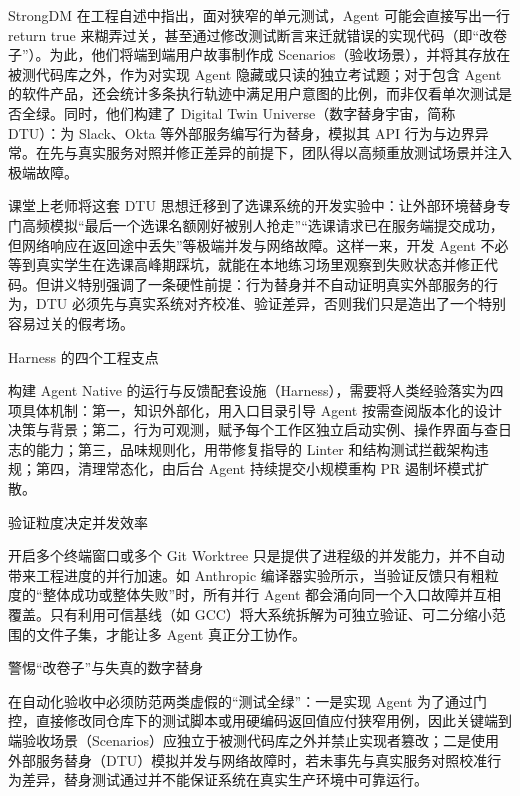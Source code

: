 \documentclass[UTF8,a4paper,11pt,fontset=fandol]{ctexart}
\begin{document}
StrongDM 在工程自述中指出，面对狭窄的单元测试，Agent 可能会直接写出一行 return true 来糊弄过关，甚至通过修改测试断言来迁就错误的实现代码（即“改卷子”）。为此，他们将端到端用户故事制作成 Scenarios（验收场景），并将其存放在被测代码库之外，作为对实现 Agent 隐藏或只读的独立考试题；对于包含 Agent 的软件产品，还会统计多条执行轨迹中满足用户意图的比例，而非仅看单次测试是否全绿。同时，他们构建了 Digital Twin Universe（数字替身宇宙，简称 DTU）：为 Slack、Okta 等外部服务编写行为替身，模拟其 API 行为与边界异常。在先与真实服务对照并修正差异的前提下，团队得以高频重放测试场景并注入极端故障。

课堂上老师将这套 DTU 思想迁移到了选课系统的开发实验中：让外部环境替身专门高频模拟“最后一个选课名额刚好被别人抢走”“选课请求已在服务端提交成功，但网络响应在返回途中丢失”等极端并发与网络故障。这样一来，开发 Agent 不必等到真实学生在选课高峰期踩坑，就能在本地练习场里观察到失败状态并修正代码。但讲义特别强调了一条硬性前提：行为替身并不自动证明真实外部服务的行为，DTU 必须先与真实系统对齐校准、验证差异，否则我们只是造出了一个特别容易过关的假考场。

\begin{importantbox}{Harness 的四个工程支点}

构建 Agent Native 的运行与反馈配套设施（Harness），需要将人类经验落实为四项具体机制：第一，知识外部化，用入口目录引导 Agent 按需查阅版本化的设计决策与背景；第二，行为可观测，赋予每个工作区独立启动实例、操作界面与查日志的能力；第三，品味规则化，用带修复指导的 Linter 和结构测试拦截架构违规；第四，清理常态化，由后台 Agent 持续提交小规模重构 PR 遏制坏模式扩散。

\end{importantbox}

\begin{knowledgebox}{验证粒度决定并发效率}

开启多个终端窗口或多个 Git Worktree 只是提供了进程级的并发能力，并不自动带来工程进度的并行加速。如 Anthropic 编译器实验所示，当验证反馈只有粗粒度的“整体成功或整体失败”时，所有并行 Agent 都会涌向同一个入口故障并互相覆盖。只有利用可信基线（如 GCC）将大系统拆解为可独立验证、可二分缩小范围的文件子集，才能让多 Agent 真正分工协作。

\end{knowledgebox}

\begin{warningbox}{警惕“改卷子”与失真的数字替身}

在自动化验收中必须防范两类虚假的“测试全绿”：一是实现 Agent 为了通过门控，直接修改同仓库下的测试脚本或用硬编码返回值应付狭窄用例，因此关键端到端验收场景（Scenarios）应独立于被测代码库之外并禁止实现者篡改；二是使用外部服务替身（DTU）模拟并发与网络故障时，若未事先与真实服务对照校准行为差异，替身测试通过并不能保证系统在真实生产环境中可靠运行。

\end{warningbox}
\end{document}
